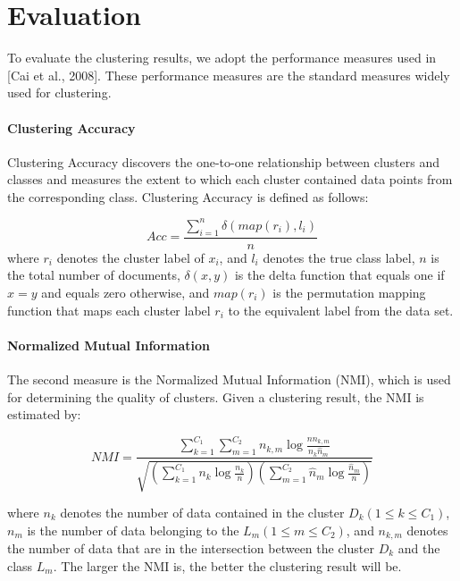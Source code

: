 \documentclass[12pt]{article}
\begin{document}
\section{Evaluation}


To evaluate the clustering results, we adopt the performance measures used in [Cai et al., 2008]. These performance measures are the standard measures widely used for clustering.

\paragraph{Clustering Accuracy} Clustering Accuracy discovers the one-to-one relationship between clusters and classes and measures the extent to which each cluster contained data points from the corresponding class. Clustering Accuracy is defined as follows:

\begin{equation}
Acc = \frac{\sum_{i=1}^{n}\delta(map(r_i),l_i)}{n}
\end{equation}
where $r_i$ denotes the cluster label of $x_i$, and $l_i$ denotes the true class label, $n$ is the total number of documents, $\delta(x, y)$ is the delta function that equals one if $x = y$ and equals zero otherwise, and $map(r_i)$ is the permutation mapping function that maps each cluster label $r_i$ to the equivalent label from the data set.

\paragraph{Normalized Mutual Information} The second measure is the Normalized Mutual Information (NMI), which is used for determining the quality of clusters. Given a clustering result,
the NMI is estimated by:

\begin{equation}
NMI = \frac{\sum_{k=1}^{C_1}\sum_{m=1}^{C_2}n_{k,m} \log \frac{nn_{k,m}}{n_k\hat{n}_m}}{\sqrt{(\sum_{k=1}^{C_1}n_k \log \frac{n_k}{n})(\sum_{m=1}^{C_2} \hat{n}_m \log \frac{\hat{n}_m}{n})}}
\end{equation}

where $n_k$ denotes the number of data contained in the cluster $D_k(1 \le k \le C_1)$, $n_m$ is the number of data belonging to the $L_m (1 \le m \le C_2)$, and $n_{k,m}$ denotes the number of data that are in the intersection between the cluster $D_k$ and the class $L_m$. The larger the NMI is, the better the clustering result will be.
\end{document}
